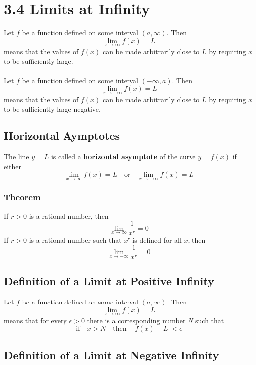 %
%

\section*{3.4 Limits at Infinity}

Let \(f\) be a function defined on some interval \((a, \infty)\). Then
$$ \lim_{x \to \infty}f(x) = L $$
means that the values of \(f(x)\) can be made arbitrarily close to \(L\) by requiring \(x\) to be sufficiently large.
\\\\
Let \(f\) be a function defined on some interval \((-\infty, a)\). Then
$$ \lim_{x \to -\infty}f(x) = L $$
means that the values of \(f(x)\) can be made arbitrarily close to \(L\) by requiring \(x\) to be sufficiently large negative.

\subsection*{Horizontal Aymptotes}

The line \(y=L\) is called a \textbf{horizontal asymptote} of the curve \(y=f(x)\) if either
$$\lim_{x \to \infty}f(x)=L \quad \text{or} \quad \lim_{x \to -\infty}f(x)=L$$

\subsubsection*{Theorem}

If \(r>0\) is a rational number, then
$$ \lim_{x \to \infty}\frac{1}{x^r}=0 $$
If \(r>0\) is a rational number such that \(x^r\) is defined for all \(x\), then
$$ \lim_{x \to -\infty}\frac{1}{x^r}=0 $$

\subsection*{Definition of a Limit at Positive Infinity}

Let \(f\) be a function defined on some interval \((a, \infty)\). Then
$$ \lim_{x \to \infty}f(x)=L$$
means that for every \(\epsilon>0\) there is a corresponding number \(N\) such that 
$$ \text{if} \quad x>N \quad \text{then} \quad \left| f(x)-L \right| <\epsilon $$ 

\subsection*{Definition of a Limit at Negative Infinity}

